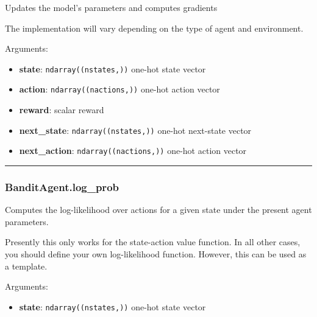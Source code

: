 \begin{Shaded}
\begin{Highlighting}[]
\end{Highlighting}
\end{Shaded}

Updates the model's parameters and computes gradients

The implementation will vary depending on the type of agent and
environment.

Arguments:

\begin{itemize}
\tightlist
\item
  \textbf{state}: \texttt{ndarray((nstates,))} one-hot state vector
\item
  \textbf{action}: \texttt{ndarray((nactions,))} one-hot action vector
\item
  \textbf{reward}: scalar reward
\item
  \textbf{next\_state}: \texttt{ndarray((nstates,))} one-hot next-state
  vector
\item
  \textbf{next\_action}: \texttt{ndarray((nactions,))} one-hot action
  vector
\end{itemize}

\begin{center}\rule{0.5\linewidth}{\linethickness}\end{center}

\subsubsection{BanditAgent.log\_prob}\label{banditagent.log_prob}

\begin{Shaded}
\begin{Highlighting}[]
\end{Highlighting}
\end{Shaded}

Computes the log-likelihood over actions for a given state under the
present agent parameters.

Presently this only works for the state-action value function. In all
other cases, you should define your own log-likelihood function.
However, this can be used as a template.

Arguments:

\begin{itemize}
\tightlist
\item
  \textbf{state}: \texttt{ndarray((nstates,))} one-hot state vector
\end{itemize}

